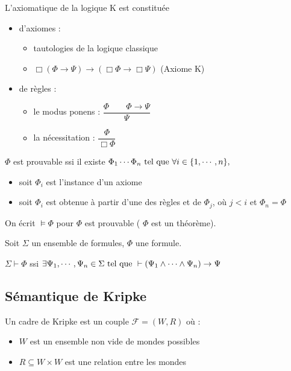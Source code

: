 \documentclass[10pt,a4paper]{article}
\newcommand{\F}{\mathcal{F}}
\begin{document}
\begin{definition}
 L'axiomatique de la logique K est constituée
\begin{itemize}
 \item d'axiomes : \begin{itemize}
                  \item tautologies de la logique classique
                  \item $\Box (\Phi \rightarrow \Psi) \rightarrow ( \Box \Phi \rightarrow \Box \Psi)$ (Axiome K) 
                 \end{itemize}
 \item de règles : \begin{itemize}
                 \item le modus ponens : $ \dfrac{ \Phi \qquad \Phi \rightarrow \Psi }{ \Psi}$
                 \item la nécessitation : $ \dfrac{ \Phi }{ \Box \Phi }$
                \end{itemize}
\end{itemize}
\end{definition}

\begin{definition}
 $\Phi$ est prouvable ssi il existe $ \Phi_1 \cdots \Phi_n \text{ tel que } \forall i \in \{1, \cdots , n \},$
\begin{itemize}
 \item soit $ \Phi_i$ est l'instance d'un axiome
 \item soit $ \Phi_i$  est obtenue à partir d'une des règles et de $ \Phi_j$, où $j < i$ et $ \Phi_n = \Phi$
\end{itemize}
On écrit $ \models \Phi$ pour $ \Phi$ est prouvable ( $ \Phi $ est un théorème).
\end{definition}

\begin{definition}[$\vdash$]
 Soit $ \Sigma$ un ensemble de formules, $ \Phi$ une formule. 

$ \Sigma \vdash \Phi$ ssi $ \exists \Psi_1, \cdots, \Psi_n \in \Sigma \text{ tel que } \\
\vdash ( \Psi_1 \wedge \cdots \wedge \Psi_n) \rightarrow \Psi$
\end{definition}

\subsection{Sémantique de Kripke}

\begin{definition}
 Un cadre de Kripke est un couple $\F = (W, R)$ où :
\begin{itemize}
 \item $W$ est un ensemble non vide de mondes possibles
 \item $ R \subseteq W \times W$ est une relation entre les mondes
\end{itemize}
\end{definition}
\end{document}
